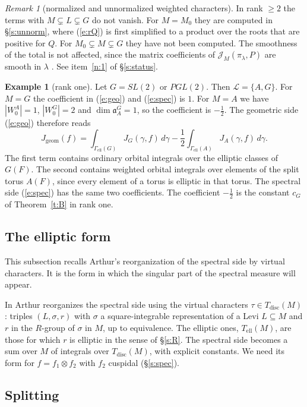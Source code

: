 \documentclass[12pt,letterpaper]{article}
\numberwithin{equation}{section}
\theoremstyle{plain}
\theoremstyle{definition}
\newtheorem{example}[theorem]{Example}
\theoremstyle{remark}
\newtheorem{remark}[theorem]{Remark}
\newcommand{\cL}{\mathcal{L}}
\newcommand{\fa}{\mathfrak{a}}
\newcommand{\ellr}{\mathrm{ell}}
\newcommand{\Tell}{T_{\mathrm{ell}}}
\newcommand{\Tdisc}{T_{\mathrm{disc}}}
\begin{document}
\begin{remark}[normalized and unnormalized weighted characters]
In rank $\ge2$ the terms with $M\subsetneq L\subsetneq G$ do not vanish. For $M=M_0$ they are computed in \S\ref{s:unnorm}, where (\ref{e:rQ}) is first simplified to a product over the roots that are positive for $Q$. For $M_0\subsetneq M\subsetneq G$ they have not been computed. The smoothness of the total is not affected, since the matrix coefficients of $\mathcal J_M(\pi_\lambda,P)$ are smooth in $\lambda$ \cite[Lemma~12.1]{Ar91}. See item~\ref{n:1} of \S\ref{s:status}.
\end{remark}

\begin{example}[rank one]\label{ex:ltf}
Let $G=SL(2)$ or $PGL(2)$. Then $\cL=\{A,G\}$. For $M=G$ the coefficient in (\ref{e:geo}) and (\ref{e:spec}) is $1$. For $M=A$ we have $|W_0^A|=1$, $|W_0^G|=2$ and $\dim\fa_A^G=1$, so the coefficient is $-\frac12$. The geometric side (\ref{e:geo}) therefore reads
\[
J_{\mathrm{geom}}(f)=\int_{\Gamma_{\ellr}(G)}J_G(\gamma,f)\,d\gamma-\frac12\int_{\Gamma_{\ellr}(A)}J_A(\gamma,f)\,d\gamma.
\]
The first term contains ordinary orbital integrals over the elliptic classes of $G(F)$. The second contains weighted orbital integrals over elements of the split torus $A(F)$, since every element of a torus is elliptic in that torus. The spectral side (\ref{e:spec}) has the same two coefficients. The coefficient $-\frac12$ is the constant $c_G$ of Theorem~\ref{t:B} in rank one.
\end{example}

\subsection{The elliptic form}\label{s:ellform}

This subsection recalls Arthur's reorganization of the spectral side by virtual characters. It is the form in which the singular part of the spectral measure will appear.

In \cite{Ar93} Arthur reorganizes the spectral side using the virtual characters $\tau\in\Tdisc(M)$: triples $(L,\sigma,r)$ with $\sigma$ a square-integrable representation of a Levi $L\subseteq M$ and $r$ in the $R$-group of $\sigma$ in $M$, up to equivalence. The elliptic ones, $\Tell(M)$, are those for which $r$ is elliptic in the sense of \S\ref{s:R}. The spectral side becomes a sum over $M$ of integrals over $\Tdisc(M)$, with explicit constants. We need its form for $f=f_1\otimes f_2$ with $f_2$ cuspidal (\S\ref{s:spec}).

\subsection{Splitting}\label{s:splitting}
\end{document}
